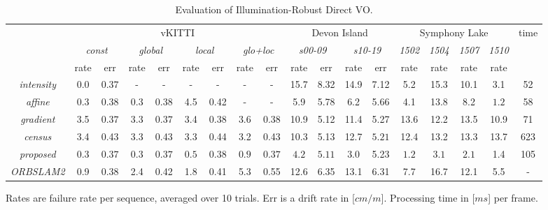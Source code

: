 \begin{table}
	\centering
	\caption[Evaluation of Illumination-Robust Direct VO]{ Evaluation of Illumination-Robust Direct VO.
	\label{tbl:illumination_directvo}}
	\begin{tabular}{|c|cccccccc|cccc|cccc|c|}
\hline
            & \multicolumn{8}{c|}{vKITTI}                                                                                                & \multicolumn{4}{c|}{Devon Island}                                                           & \multicolumn{4}{c|}{Symphony Lake} & \multirow{2}{*}{time} \\
            & \multicolumn{2}{c}{{\em const}} & \multicolumn{2}{c}{{\em global}} & \multicolumn{2}{c}{{\em local}} & \multicolumn{2}{c|}{{\em glo+loc}} & \multicolumn{2}{c}{{\em s00-09}} & \multicolumn{2}{c|}{{\em s10-19}} & {\em 1502}  & {\em 1504} & {\em 1507} & {\em 1510} &                       \\ \hline
            & rate          & err         & rate          & err          & rate          & err         & rate           & err           & rate          & err          & rate          & err       & rate    & rate   & rate   & rate   &                       \\
{\em intensity} & $\mathbf{0.0}$ & $\mathbf{0.37}$ & - & - & - & - & - & - &  15.7 & 8.32  & 14.9 & 7.12  & 5.2 & 15.3 &  10.1  & 3.1 & 52 \\
{\em affine}     & 0.3 & 0.38 & $\mathbf{0.3}$ & 0.38 &  4.5 & 0.42 & - & - & 5.9 & 5.78 & 6.2 & 5.66 & 4.1 & 13.8 & 8.2 &  $\mathbf{1.2}$ & 58\\
{\em gradient}  & 3.5 & $\mathbf{0.37}$ & 3.3 & $\mathbf{0.37}$ & 3.4 & $\mathbf{0.38}$ & 3.6 & 0.38 & 10.9 & 5.12 & 11.4 & 5.27 & 13.6 & 12.2 & 13.5 & 10.9 & 71\\
{\em census}  & 3.4 & 0.43 & 3.3 & 0.43 & 3.3 & 0.44 & 3.2 & 0.43 & 10.3 & 5.13 & 12.7 & $\mathbf{5.21}$ & 12.4 & 13.2 & 13.3 & 13.7 & 623\\
{\em proposed}  & 0.3 &  $\mathbf{0.37}$ & $\mathbf{0.3}$ &  $\mathbf{0.37}$ & $\mathbf{0.5}$ & $\mathbf{0.38}$ &  $\mathbf{0.9}$ & $\mathbf{0.37}$ & $\mathbf{4.2}$ & $\mathbf{5.11}$ & $\mathbf{3.0}$ &  5.23  & $\mathbf{1.2}$  &  $ \mathbf{3.1}$  & $\mathbf{2.1}$ & 1.4  &  105 \\
{\em ORBSLAM2}  & 0.9 & 0.38 & 2.4 & 0.42 & 1.8 & 0.41 & 5.3 & 0.55 & 12.6 & 6.35 & 13.1  & 6.31  & 7.7  &   16.7     &  12.1 & 5.5 & - \\ \hline
	\end{tabular}
	{\footnotesize  * Rates are failure rate per sequence, averaged over 10 trials. Err is a drift rate in [$cm/m$]. Processing time in [$ms$] per frame. }	
	
\end{table}

